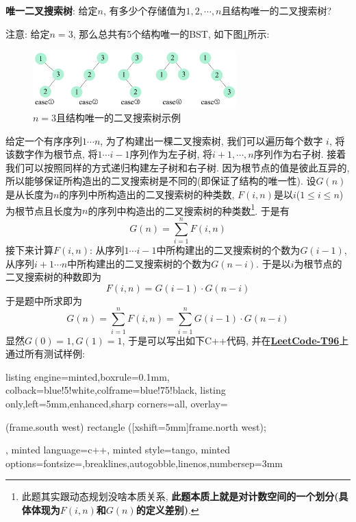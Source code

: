 \documentclass{article}
\begin{document}
\begin{homeworkProblem}
    \textbf{唯一二叉搜索树}: 给定$n$, 有多少个存储值为$1,2,\cdots,n$且结构唯一的二叉搜索树?

    注意: 给定$n=3$, 那么总共有5个结构唯一的BST, 如下图\ref{fig:二叉搜索树示例}所示:
    \begin{figure}[H]  %
		\centering
		\includegraphics[width=0.7\textwidth]{images/title/二叉搜索树示例.pdf}
		\caption{$n=3$且结构唯一的二叉搜索树示例}
		\label{fig:二叉搜索树示例}
	\end{figure}
    \solution 给定一个有序序列$1\cdots n$, 为了构建出一棵二叉搜索树, 我们可以遍历每个数字 $i$, 将该数字作为根节点, 将$1\cdots i-1$序列作为左子树, 将$i+1,\cdots,n$序列作为右子树. 接着我们可以按照同样的方式递归构建左子树和右子树. 因为根节点的值是彼此互异的, 所以能够保证所构造出的二叉搜索树是不同的(即保证了结构的唯一性). 设$G(n)$是从长度为$n$的序列中所构造出的二叉搜索树的种类数, $F(i,n)$是以$i$($1\leq i\leq n$)为根节点且长度为$n$的序列中构造出的二叉搜索树的种类数\footnote{此题其实跟动态规划没啥本质关系, \textbf{此题本质上就是对计数空间的一个划分(具体体现为$F(i,n)$和$G(n)$的定义差别)}.}. 于是有$$G\left( n \right) =\sum_{i=1}^n{F\left( i,n \right)}
    $$
    接下来计算$F(i,n)$: 从序列$1\cdots i-1$中所构建出的二叉搜索树的个数为$G(i-1)$, 从序列$i+1\cdots n$中所构建出的二叉搜索树的个数为$G(n-i)$. 于是以$i$为根节点的二叉搜索树的种数即为$$F\left( i,n \right) =G\left( i-1 \right) \cdot G\left( n-i \right) 
    $$
    于是题中所求即为$$G\left( n \right) =\sum_{i=1}^n{F\left( i,n \right)}=\sum_{i=1}^n{G\left( i-1 \right) \cdot G\left( n-i \right)}
    $$
    显然$G(0)=1,G(1)=1$, 于是可以写出如下C++代码, 并在\href{https://leetcode.cn/problems/unique-binary-search-trees/description/}{\textbf{LeetCode-T96}}上通过所有测试样例:
\begin{tcblisting}{listing engine=minted,boxrule=0.1mm,
colback=blue!5!white,colframe=blue!75!black,
listing only,left=5mm,enhanced,sharp corners=all,
overlay={\begin{tcbclipinterior} (frame.south west)
rectangle ([xshift=5mm]frame.north west);\end{tcbclipinterior}},
minted language=c++,
minted style=tango,
minted options={fontsize=\small,breaklines,autogobble,linenos,numbersep=3mm}}

\end{tcblisting}
\end{homeworkProblem}
\end{document}
